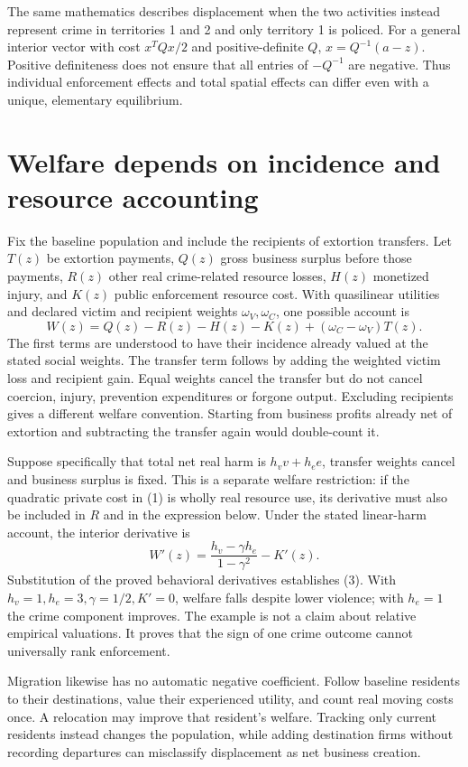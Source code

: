 \documentclass[11pt,a4paper]{article}
\begin{document}
The same mathematics describes displacement when the two activities instead represent crime in territories 1 and 2 and only territory 1 is policed. For a general interior vector with cost $x^TQx/2$ and positive-definite $Q$, $x=Q^{-1}(a-z)$. Positive definiteness does not ensure that all entries of $-Q^{-1}$ are negative. Thus individual enforcement effects and total spatial effects can differ even with a unique, elementary equilibrium.

\section{Welfare depends on incidence and resource accounting}
Fix the baseline population and include the recipients of extortion transfers. Let $T(z)$ be extortion payments, $Q(z)$ gross business surplus before those payments, $R(z)$ other real crime-related resource losses, $H(z)$ monetized injury, and $K(z)$ public enforcement resource cost. With quasilinear utilities and declared victim and recipient weights $\omega_V,\omega_C$, one possible account is
\[
 W(z)=Q(z)-R(z)-H(z)-K(z)+(\omega_C-\omega_V)T(z). \tag{2}
\]
The first terms are understood to have their incidence already valued at the stated social weights. The transfer term follows by adding the weighted victim loss and recipient gain. Equal weights cancel the transfer but do not cancel coercion, injury, prevention expenditures or forgone output. Excluding recipients gives a different welfare convention. Starting from business profits already net of extortion and subtracting the transfer again would double-count it.

Suppose specifically that total net real harm is $h_vv+h_ee$, transfer weights cancel and business surplus is fixed. This is a separate welfare restriction: if the quadratic private cost in (1) is wholly real resource use, its derivative must also be included in $R$ and in the expression below. Under the stated linear-harm account, the interior derivative is
\[
 W'(z)=\frac{h_v-\gamma h_e}{1-\gamma^2}-K'(z). \tag{3}
\]
Substitution of the proved behavioral derivatives establishes (3). With $h_v=1,h_e=3,\gamma=1/2,K'=0$, welfare falls despite lower violence; with $h_e=1$ the crime component improves. The example is not a claim about relative empirical valuations. It proves that the sign of one crime outcome cannot universally rank enforcement.

Migration likewise has no automatic negative coefficient. Follow baseline residents to their destinations, value their experienced utility, and count real moving costs once. A relocation may improve that resident's welfare. Tracking only current residents instead changes the population, while adding destination firms without recording departures can misclassify displacement as net business creation.
\end{document}
